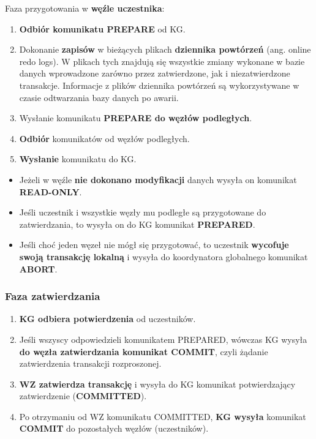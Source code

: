 \documentclass[a4paper]{article}
\begin{document}
    Faza przygotowania w \textbf{węźle uczestnika}:
    \begin{enumerate}
        \item \textbf{Odbiór komunikatu PREPARE} od KG.
        \item Dokonanie \textbf{zapisów} w bieżących plikach \textbf{dziennika powtórzeń} (ang. online
        redo logs). W plikach tych znajdują się wszystkie zmiany wykonane w bazie
        danych wprowadzone zarówno przez zatwierdzone, jak i niezatwierdzone transakcje. Informacje z
        plików dziennika powtórzeń są wykorzystywane w czasie odtwarzania bazy danych po awarii.
        \item Wysłanie komunikatu \textbf{PREPARE do węzłów podległych}.
        \item \textbf{Odbiór} komunikatów od węzłów podległych.
        \item \textbf{Wysłanie} komunikatu do KG.
    \end{enumerate}

    \begin{itemize}
        \item Jeżeli w węźle \textbf{nie dokonano modyfikacji} danych wysyła on komunikat \textbf{READ-ONLY}.
        \item Jeśli uczestnik i wszystkie węzły mu podległe są przygotowane do
        zatwierdzania, to wysyła on do KG komunikat \textbf{PREPARED}.
        \item Jeśli choć jeden węzeł nie mógł się przygotować, to uczestnik \textbf{wycofuje swoją
        transakcję lokalną} i wysyła do koordynatora globalnego komunikat \textbf{ABORT}.
    \end{itemize}

    \subsubsection{Faza zatwierdzania}
    \begin{enumerate}
        \item \textbf{KG odbiera potwierdzenia} od uczestników.
        \item Jeśli wszyscy odpowiedzieli komunikatem PREPARED, wówczas KG wysyła
        \textbf{do węzła zatwierdzania komunikat COMMIT}, czyli żądanie zatwierdzenia
        transakcji rozproszonej.
        \item \textbf{WZ zatwierdza transakcję} i wysyła do KG komunikat
        potwierdzający zatwierdzenie (\textbf{COMMITTED}).
        \item Po otrzymaniu od WZ komunikatu COMMITTED, \textbf{KG wysyła} komunikat
        \textbf{COMMIT} do pozostałych węzłów (uczestników).
    \end{enumerate}
\end{document}

